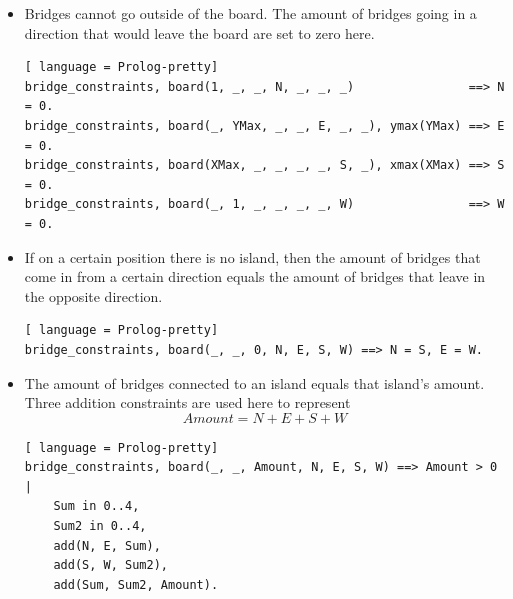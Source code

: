 \documentclass{report}
\begin{document}
\begin{itemize}
\item Bridges cannot go outside of the board. The amount of bridges going in a direction that would leave the board are set to zero here.
\begin{lstlisting}[ language = Prolog-pretty]
bridge_constraints, board(1, _, _, N, _, _, _)                ==> N = 0.
bridge_constraints, board(_, YMax, _, _, E, _, _), ymax(YMax) ==> E = 0.
bridge_constraints, board(XMax, _, _, _, _, S, _), xmax(XMax) ==> S = 0.
bridge_constraints, board(_, 1, _, _, _, _, W)                ==> W = 0.
\end{lstlisting}
\item If on a certain position there is no island, then the amount of bridges that come in from a certain direction equals the amount of bridges that leave in the opposite direction.
\begin{lstlisting}[ language = Prolog-pretty]
bridge_constraints, board(_, _, 0, N, E, S, W) ==> N = S, E = W.
\end{lstlisting}
\item The amount of bridges connected to an island equals that island's amount. Three addition constraints are used here to represent \[ Amount = N + E + S + W \]
	    \begin{lstlisting}[ language = Prolog-pretty]
bridge_constraints, board(_, _, Amount, N, E, S, W) ==> Amount > 0 |
    Sum in 0..4,
    Sum2 in 0..4,
    add(N, E, Sum),
    add(S, W, Sum2),
    add(Sum, Sum2, Amount).
\end{lstlisting}
\end{itemize}
\end{document}
